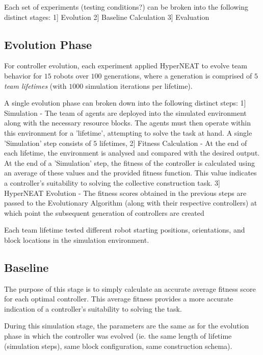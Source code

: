 Each set of experiments (testing conditions?) can be broken into the following distinct stages:
1] Evolution 
2] Baseline Calculation
3] Evaluation


\subsection{Evolution Phase}

For controller evolution, each experiment applied HyperNEAT to evolve team behavior for
$15$ robots over $100$ generations,
where a generation is comprised of $5$ \textit{team lifetimes} (with $1000$ simulation iterations per lifetime).

A single evolution phase can broken down into the following distinct steps:
1] Simulation - The team of agents are deployed into the simulated environment along with the necessary resource blocks. The agents must then operate within this environment for a 'lifetime', attempting to solve the task at hand.  A single 'Simulation' step consists of $5$ lifetimes,
2] Fitness Calculation - At the end of each lifetime, the environment is analysed and compared with the desired output. At the end of a 'Simulation' step, the fitness of the controller is calculated using an average of these values and the provided fitness function. This value indicates a controller's suitability to solving the collective construction task.
3] HyperNEAT Evolution - The fitness scores obtained in the previous steps are passed to the Evolutionary Algorithm (along with their respective controllers) at which point the subsequent generation of controllers are created

Each team lifetime tested different robot starting positions, orientations, and block locations
in the simulation environment.


\subsection{Baseline}

The purpose of this stage is to simply calculate an accurate average fitness score for each optimal controller. This average fitness provides a more accurate indication of a controller's suitability to solving the task.

During this simulation stage, the parameters are the same as for the evolution phase in which the controller was evolved (ie. the same length of lifetime (simulation steps), same block configuration, same construction schema).

